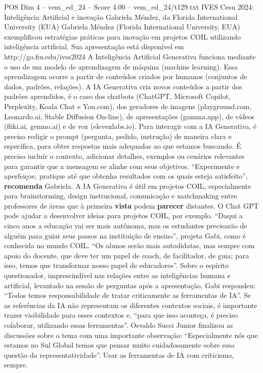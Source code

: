 \begin{textsample}{POS Dim 4 – vem\_ed\_24 – Score 4.00 – vem\_ed\_24/t129.txt}  \label{ex:f4_pos_102}
IVES Cesu 2024: Inteligência Artificial e inovação Gabriela Méndez, da Florida International University (EUA) Gabriela Méndez (Florida International University, EUA) exemplificou estratégias práticas para inovação em projetos COIL utilizando inteligência artificial.
Sua apresentação está disponível em http://go.fiu.edu/ives2024 A Inteligência Artificial Generativa funciona mediante o uso de um modelo de aprendizagem de máquina (machine learning).
Essa aprendizagem ocorre a partir de conteúdos criados por humanos (conjuntos de dados, padrões, relações).
A IA Generativa cria novos conteúdos a partir dos padrões aprendidos, é o caso dos chatbots (ChatGPT, Microsoft Copilot, Perplexity, Koala Chat e You.com), dos geradores de imagens (playground.com, Leonardo.ai, Stable Diffusion On-line), de apresentações (gamma.app), de vídeos (fliki.ai, genmo.ai) e de voz (elevenlabs.io).
Para interagir com a IA Generativa, é preciso redigir o prompt (pergunta, pedido, instrução) de maneira clara e específica, para obter respostas mais adequadas ao que estamos buscando.
É preciso incluir o contexto, adicionar detalhes, exemplos ou cenários relevantes para garantir que a mensagem se alinhe com seus objetivos. “Experimente e aperfeiçoe, pratique até que obtenha resultados com os quais esteja satisfeito”, \textbf{recomenda} Gabriela.
A IA Generativa é útil em projetos COIL, especialmente para brainstorming, design instrucional, comunicação e matchmaking entre professores de áreas que à primeira \textbf{vista} podem \textbf{parecer} distantes.
O Chat GPT pode ajudar a desenvolver ideias para projetos COIL, por exemplo. “Daqui a cinco anos a educação vai ser mais autônoma, mas os estudantes precisarão de alguém para guiar seus passos na instituição de ensino”, projeta Gabi, como é conhecida no mundo COIL. “Os alunos serão mais autodidatas, mas sempre com apoio do docente, que deve ter um papel de coach, de facilitador, de guia; para isso, temos que transformar nosso papel de educadores”.
Sobre o espírito questionador, imprescindível nas relações entre as inteligências humana e artificial, levantado na sessão de perguntas após a apresentação, Gabi respondeu: “Todos temos responsabilidade de tratar criticamente as ferramentas de IA”.
Se as referências da IA não representam os diferentes contextos sociais, é importante trazer visibilidade para esses contextos e, “para que isso aconteça, é preciso colaborar, utilizando essas ferramentas”.
Osvaldo Succi Junior finalizou as discussões sobre o tema com uma importante observação: “Especialmente nós que estamos no Sul Global temos que pensar muito cuidadosamente sobre essa questão da representatividade”.
Usar as ferramentas de IA com criticismo, sempre.

\end{textsample}

